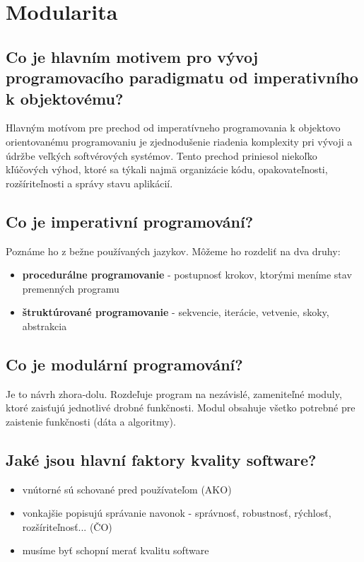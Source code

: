 
\section{Modularita}
\subsection{Co je hlavním motivem pro vývoj programovacího paradigmatu od imperativního k objektovému?}
Hlavným motívom pre prechod od imperatívneho programovania k objektovo orientovanému programovaniu je zjednodušenie riadenia komplexity pri vývoji a údržbe veľkých softvérových systémov. Tento prechod priniesol niekoľko kľúčových výhod, ktoré sa týkali najmä organizácie kódu, opakovateľnosti, rozšíriteľnosti a správy stavu aplikácií.


\subsection{Co je imperativní programování?}
Poznáme ho z bežne používaných jazykov. Môžeme ho rozdeliť na dva druhy:

\begin{itemize}
    \item \textbf{procedurálne programovanie} - postupnosť krokov, ktorými meníme stav premenných programu
    \item \textbf{štruktúrované programovanie} - sekvencie, iterácie, vetvenie, skoky, abstrakcia

\end{itemize}


\subsection{Co je modulární programování?}
Je to návrh zhora-dolu. Rozdeľuje program na nezávislé, zameniteľné moduly, ktoré zaisťujú jednotlivé drobné funkčnosti. Modul obsahuje všetko potrebné pre zaistenie funkčnosti (dáta a algoritmy). 


\subsection{Jaké jsou hlavní faktory kvality software?}
\begin{itemize}
    \item vnútorné sú schované pred používateľom (AKO)
    \item vonkajšie popisujú správanie navonok - správnosť, robustnosť, rýchlosť, rozšíriteľnosť... (ČO)
    \item musíme byť schopní merať kvalitu software
\end{itemize}


